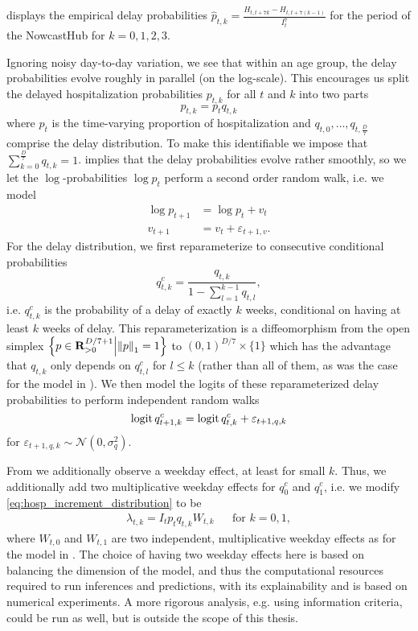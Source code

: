  displays the empirical delay probabilities $\hat p_{t,k} = \frac{H_{t, t + 7k} - H_{t,t + 7 (k - 1)}}{I^{7}_t}$ for the period of the NowcastHub for $k = 0, 1, 2, 3$.

Ignoring noisy day-to-day variation, we see that within an age group, the delay probabilities evolve roughly in parallel (on the log-scale). This encourages us split the delayed hospitalization probabilities $p_{t,k}$ for all $t$ and $k$ into two parts 
$$
    p_{t,k} = p_{t}q_{t,k}
$$
where $p_{t}$ is the time-varying proportion of hospitalization and $q_{t,0}, \dots, q_{t,\frac{D}{7}}$ comprise the delay distribution. To make this identifiable we impose that $\sum_{k = 0}^{\frac{D}{7}} q_{t,k} = 1$.
 implies that the delay probabilities evolve rather smoothly, so we let the $\log$-probabilities $\log p_{t}$ perform a second order random walk, i.e. we model
\begin{align*}
    \log p^{}_{t + 1} &= \log p^{}_t + v_t \\
    v_{t + 1} &= v_{t} + \varepsilon_{t + 1, v}.
\end{align*}
For the delay distribution, we first reparameterize to consecutive conditional probabilities 
$$
    q^{c}_{t,k} = \frac{q_{t,k}}{1 - \sum_{l = 1}^{k - 1} q_{t,l}},
$$
i.e. $q^{c}_{t,k}$ is the probability of a delay of exactly $k$ weeks, conditional on having at least $k$ weeks of delay. This reparameterization is a diffeomorphism from the open simplex $\left\{p \in \mathbf R^{D / 7 + 1}_{> 0} \middle| \left\lVert p \right\rVert_{1} = 1 \right\}$ to $(0, 1)^{D / 7} \times \{1\}$ which has the advantage that $q_{t,k}$ only depends on $q^{c}_{t,l}$ for $l \leq k$ (rather than all of them, as was the case for the model in ). We then model the logits of these reparameterized delay probabilities to perform independent random walks 
$$
    \operatorname{logit} q^{c}_{t+1,k} = \operatorname{logit} q^{c}_{t,k} + \varepsilon_{t + 1,q,k}
$$
for $\varepsilon_{t + 1, q, k} \sim \mathcal N(0, \sigma^{2}_{q})$. 

From  we additionally observe a weekday effect, at least for small $k$. Thus, we additionally add two multiplicative weekday effects for $q^{c}_0$ and $q^{c}_1$, i.e. we modify \eqref{eq:hosp_increment_distribution} to be
\begin{align}
    \label{eq:hosp_lambda_weekday}
    \lambda_{t,k} = I_{t} p_{t} q_{t,k} W_{t,k} && \text{for } k = 0, 1,
\end{align}
where $W_{t,0}$ and $W_{t,1}$ are two independent, multiplicative weekday effects as for the model in . The choice of having two weekday effects here is based on balancing the dimension of the model, and thus the computational resources required to run inferences and predictions, with its explainability and is based on numerical experiments. A more rigorous analysis, e.g. using information criteria, could be run as well, but is outside the scope of this thesis.

